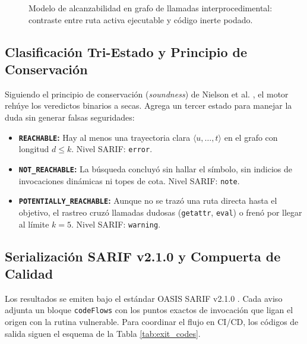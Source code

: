 \documentclass[conference]{IEEEtran}
\begin{document}
\begin{figure}[!htbp]
{
}
\caption{Modelo de alcanzabilidad en grafo de llamadas interprocedimental: contraste entre ruta activa ejecutable y código inerte podado.}
\label{fig:tikz_reachability}
\end{figure}

\subsection{Clasificación Tri-Estado y Principio de Conservación}
Siguiendo el principio de conservación (\textit{soundness}) de Nielson et al. \cite{nielson1999principles}, el motor rehúye los veredictos binarios a secas. Agrega un tercer estado para manejar la duda sin generar falsas seguridades:
\begin{itemize}
    \item \textbf{\texttt{REACHABLE}:} Hay al menos una trayectoria clara $\langle u, \dots, t \rangle$ en el grafo con longitud $d \le k$. Nivel SARIF: \texttt{error}.
    \item \textbf{\texttt{NOT\_REACHABLE}:} La búsqueda concluyó sin hallar el símbolo, sin indicios de invocaciones dinámicas ni topes de cota. Nivel SARIF: \texttt{note}.
    \item \textbf{\texttt{POTENTIALLY\_REACHABLE}:} Aunque no se trazó una ruta directa hasta el objetivo, el rastreo cruzó llamadas dudosas (\texttt{getattr}, \texttt{eval}) o frenó por llegar al límite $k=5$. Nivel SARIF: \texttt{warning}.
\end{itemize}

\subsection{Serialización SARIF v2.1.0 y Compuerta de Calidad}
Los resultados se emiten bajo el estándar OASIS SARIF v2.1.0 \cite{oasis2019sarif}. Cada aviso adjunta un bloque \texttt{codeFlows} con los puntos exactos de invocación que ligan el origen con la rutina vulnerable. Para coordinar el flujo en CI/CD, los códigos de salida siguen el esquema de la Tabla \ref{tab:exit_codes}.
\end{document}
